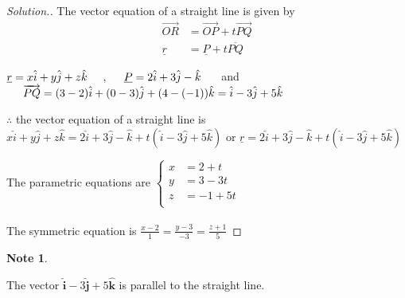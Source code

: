 \documentclass[11pt,a4paper]{article}
\theoremstyle{definition}
\newtheorem*{note}{Note}
\newenvironment{solution}
  {\renewcommand{\qedsymbol}{}\begin{proof}[\textit{Solution}.]}
  {\end{proof}}
\begin{document}
\begin{solution}


The vector equation of a straight line is given by 
\begin{align*}
\overrightarrow{OR} & = \overrightarrow{OP} + t \overrightarrow{PQ}\\
\underline{r} & = \underline{P} + t \overline{PQ}
\end{align*}

$\underline{r} = x\hat{i} + y\hat{j} + z\hat{k} \hspace{0.5cm}, \hspace{0.5cm} \underline{P} = 2\hat{i} + 3\hat{j} - \hat{k}\hspace{0.5cm}$ and $\hspace{0.5cm} \overrightarrow{PQ} = (3 - 2)\hat{i} + (0-3)\hat{j} + (4-(-1))\hat{k} = \hat{i} - 3\hat{j} + 5\hat{k}$


$\therefore$ the vector equation of a straight line is   $x\hat{i} + y\hat{j} + z\hat{k} = 2\hat{i} + 3\hat{j} - \hat{k} + t (\hat{i} - 3\hat{j} + 5\hat{k})$ or $\underline{r}=  2\hat{i} + 3\hat{j} - \hat{k} + t (\hat{i} - 3\hat{j} + 5\hat{k})$


The parametric equations  are\hspace{0.3cm}
$\displaystyle{
\begin{cases}
x & = 2 + t\\
y & = 3 - 3t\\
z & = -1 + 5t\\
\end{cases}}$\\\\

The symmetric equation is  \hspace{0.2cm}$\displaystyle{\frac{x-2}{1} = \frac{y - 3}{-3} = \frac{z + 1}{5}}$
\end{solution}


\begin{note}
\end{note}


The vector $\hat{\textbf{i}} - 3 \hat{\textbf{j}} + 5\hat{\textbf{k}}$ is parallel to the straight line.
\end{document}
